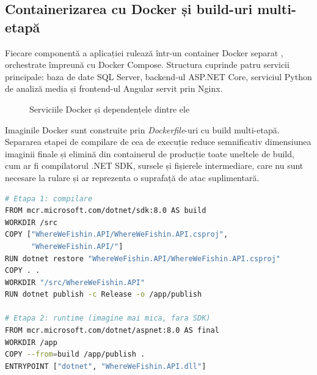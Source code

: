 \subsection{Containerizarea cu Docker și build-uri multi-etapă}

Fiecare componentă a aplicației rulează într-un container Docker separat \citep{docker}, orchestrate împreună cu Docker Compose. Structura cuprinde patru servicii principale: baza de date SQL Server, backend-ul ASP.NET Core, serviciul Python de analiză media și frontend-ul Angular servit prin Nginx.

\begin{figure}[htbp]
\centering
{}
\caption{Serviciile Docker și dependențele dintre ele}
\label{fig:docker-services}
\end{figure}

Imaginile Docker sunt construite prin \emph{Dockerfile}-uri cu build multi-etapă. Separarea etapei de compilare de cea de execuție reduce semnificativ dimensiunea imaginii finale și elimină din containerul de producție toate uneltele de build, cum ar fi compilatorul .NET SDK, sursele și fișierele intermediare, care nu sunt necesare la rulare și ar reprezenta o suprafață de atac suplimentară.

\begin{lstlisting}[language=bash, caption={Dockerfile multi-etapă pentru backend-ul ASP.NET Core}]
# Etapa 1: compilare
FROM mcr.microsoft.com/dotnet/sdk:8.0 AS build
WORKDIR /src
COPY ["WhereWeFishin.API/WhereWeFishin.API.csproj",
      "WhereWeFishin.API/"]
RUN dotnet restore "WhereWeFishin.API/WhereWeFishin.API.csproj"
COPY . .
WORKDIR "/src/WhereWeFishin.API"
RUN dotnet publish -c Release -o /app/publish

# Etapa 2: runtime (imagine mai mica, fara SDK)
FROM mcr.microsoft.com/dotnet/aspnet:8.0 AS final
WORKDIR /app
COPY --from=build /app/publish .
ENTRYPOINT ["dotnet", "WhereWeFishin.API.dll"]
\end{lstlisting}


